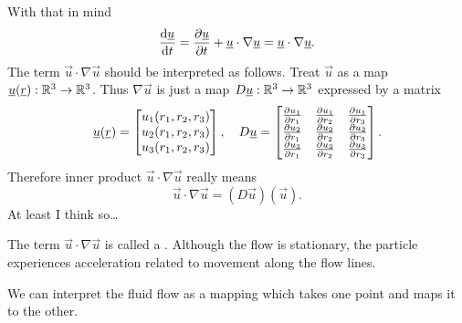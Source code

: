 \documentclass[../main.tex]{subfiles}
\begin{document}
    With that in mind
    \begin{displaymath}
      \frac{\mathrm{d} \underline{u}}{\mathrm{d} t} = \frac{\partial \underline{u}}{\partial t} + \underline{u} \cdot \nabla \underline{u} = \underline{u} \cdot \nabla \underline{u}.
    \end{displaymath}
    The term $\vec u \cdot \nabla \vec u$ should be interpreted as follows.
    Treat $\vec u$ as a map $\underline{u}(\underline{r}): \mathbb{R}^3 \rightarrow \mathbb{R}^3$. 
    Thus $\nabla \vec u$ is just a map $D \underline{u}: \mathbb{R}^3 \rightarrow \mathbb{R}^3$ expressed by a matrix
    \begin{displaymath}
      \underline{u}(\underline{r}) = \begin{bmatrix}
        u_1 (r_1, r_2, r_3)\\
        u_2 (r_1, r_2, r_3)\\
        u_3 (r_1, r_2, r_3)
      \end{bmatrix}, \quad 
      D \underline{u} = \begin{bmatrix}
        \frac{\partial u_1}{\partial r_1} & \frac{\partial u_1}{\partial r_2} & \frac{\partial u_1}{\partial r_3} \\
        \frac{\partial u_2}{\partial r_1} & \frac{\partial u_2}{\partial r_2} & \frac{\partial u_2}{\partial r_3} \\
        \frac{\partial u_3}{\partial r_1} & \frac{\partial u_3}{\partial r_2} & \frac{\partial u_3}{\partial r_3}
      \end{bmatrix}.
    \end{displaymath}
    Therefore inner product $\vec u \cdot \nabla \vec u$ really means
    \begin{displaymath}
      \vec u \cdot \nabla \vec u = (D \vec u)(\vec u).
    \end{displaymath}
    At least I think so\dots
    

    
    The term $\vec u \cdot \nabla \vec u$ is called a .
    Although the flow is stationary, the particle experiences acceleration related to movement along the flow lines. 
    
    
    We can interpret the fluid flow as a mapping which takes one point and maps it to the other.

    \begin{figure}
      \centering
      \label{fig:1.10}
    \end{figure}
\end{document}
